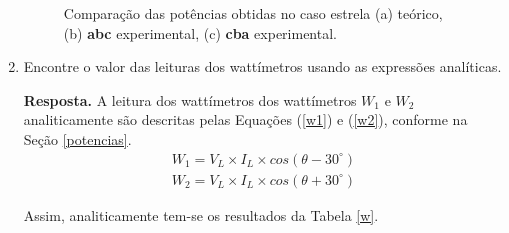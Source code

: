 \documentclass[a4paper,12pt,oneside,openany,table,xcdraw]{article}
\begin{document}
\begin{enumerate}[1)]
\begin{figure}[H]
\centering
\captionsetup{font=scriptsize}
\hfill
{}\hfill
{}
\caption{Comparação das potências obtidas no caso estrela (a) teórico, (b) \textbf{abc} experimental, (c) \textbf{cba} experimental.}
\label{pot-tab1}
\end{figure}


\item  Encontre o valor das leituras dos wattímetros usando as expressões analíticas. \vspace{0.8mm}

\textbf{Resposta.} A leitura dos wattímetros dos wattímetros $W_1$ e $W_2$ analiticamente são descritas pelas Equações (\ref{w1}) e (\ref{w2}), conforme na Seção \ref{potencias}.
\begin{gather}
W_1 = V_L \times I_L \times cos(\theta - 30^\circ)\label{w1}\\
W_2 = V_L \times I_L \times cos(\theta + 30^\circ)\label{w2}
\end{gather}

Assim, analiticamente tem-se os resultados da Tabela \ref{w}.


\end{enumerate}
\end{document}

